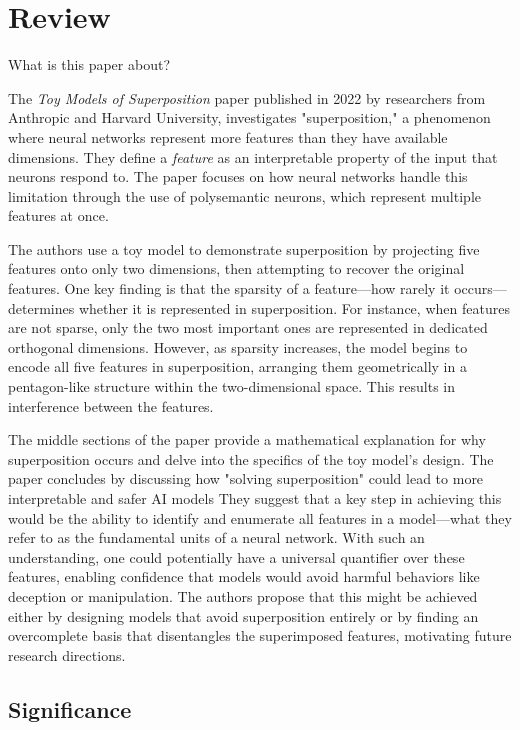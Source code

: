 \section{Review}
\label{sec:review}

What is this paper about?

The \textit{Toy Models of Superposition} paper \cite{elhage2022toy} published in 2022 by researchers from Anthropic and Harvard University, investigates "superposition," a phenomenon where neural networks represent more features than they have available dimensions.
They define a \textit{feature} as an interpretable property of the input that neurons respond to.
The paper focuses on how neural networks handle this limitation through the use of polysemantic neurons, which represent multiple features at once.

The authors use a toy model to demonstrate superposition by projecting five features onto only two dimensions, then attempting to recover the original features.
One key finding is that the sparsity of a feature—how rarely it occurs—determines whether it is represented in superposition. For instance, when features are not sparse, only the two most important ones are represented in dedicated orthogonal dimensions.
However, as sparsity increases, the model begins to encode all five features in superposition, arranging them geometrically in a pentagon-like structure within the two-dimensional space.
This results in interference between the features.

The middle sections of the paper provide a mathematical explanation for why superposition occurs and delve into the specifics of the toy model's design.
The paper concludes by discussing how "solving superposition" could lead to more interpretable and safer AI models
They suggest that a key step in achieving this would be the ability to identify and enumerate all features in a model—what they refer to as the fundamental units of a neural network.
With such an understanding, one could potentially have a universal quantifier over these features, enabling confidence that models would avoid harmful behaviors like deception or manipulation.
The authors propose that this might be achieved either by designing models that avoid superposition entirely or by finding an overcomplete basis that disentangles the superimposed features, motivating future research directions.


\subsection{Significance}

